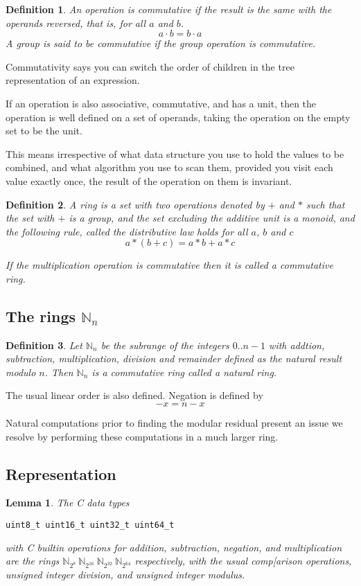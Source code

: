 \documentclass{article}
\newtheorem{lemma}{Lemma}
\newtheorem{definition}{Definition}
\begin{document}
\begin{definition}
An operation is {\em commutative} if the result is the same with the operands
reversed, that is, for all $a$ and $b$.
$$a \cdot b = b \cdot a$$
A group is said to be commutative if the group operation is commutative.
\end{definition}

Commutativity says you can switch the order of children in the tree representation
of an expression.

If an operation is also associative, commutative, and has a unit, then the operation
is well defined on a set of operands, taking the operation on the empty
set to be the unit. 

This means irrespective of what data structure you use to hold the
values to be combined, and what algorithm you use to scan them,
provided you visit each value exactly once, the result of the
operation on them is invariant.

\begin{definition}
A {\em ring} is a set with two operations denoted by $+$ and $*$ such
that the set with $+$ is a group, and the set excluding the additive
unit is a monoid, and the following rule, called the
{\em distributive law} holds for all $a$, $b$ and $c$
$$a * (b + c)  = a * b + a * c$$

If the multiplication operation is commutative then it is called
a commutative ring.
\end{definition}

\subsection{The rings $\mathbb{N}_n$}
\begin{definition}
Let $\mathbb{N}_n$ be the subrange of the integers $0..n-1$ with 
addtion, subtraction, 
multiplication, division and remainder defined as the natural result modulo $n$.
Then $\mathbb{N}_n$ is a commutative ring called a {\em natural ring}.
\end{definition}

The usual linear order is also defined.  Negation is defined by
$$-x = n - x$$

Natural computations prior to finding the modular residual present an issue
we resolve by performing these computations in a much larger ring.

\subsection{Representation}
\begin{lemma} The C data types
\begin{verbatim}
uint8_t uint16_t uint32_t uint64_t
\end{verbatim}
with C builtin operations for addition, subtraction, negation, and multiplication
are the rings
\(\mathbb{N}_{2^8}\ \mathbb{N}_{2^{16}}\ \mathbb{N}_{2^{32}}\ \mathbb{N}_{2^{64}} \)
respectively, with the usual comp[arison operations, unsigned integer division,
and unsigned integer modulus.
\end{lemma}
\end{document}
